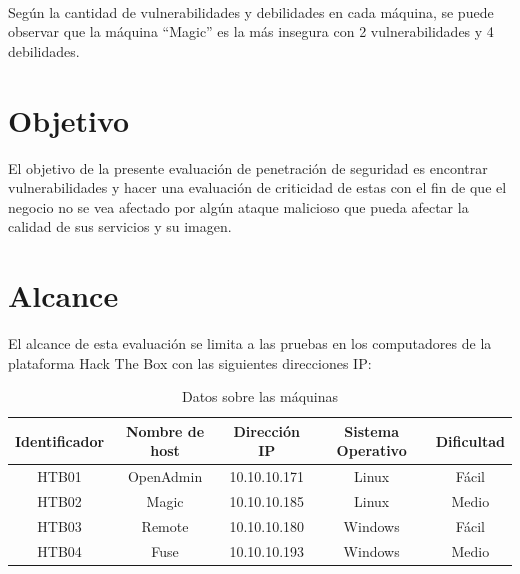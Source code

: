 \documentclass[a4paper]{article}
\begin{document}
\\
\large{Según la cantidad de vulnerabilidades y debilidades en cada máquina, se puede observar que la máquina “Magic” es la más insegura con 2 vulnerabilidades y 4 debilidades.}

\clearpage
\section{Objetivo}
\large{El objetivo de la presente evaluación de penetración de seguridad es encontrar vulnerabilidades y hacer una evaluación de criticidad de estas con el fin de que el negocio no se vea afectado por algún ataque malicioso que pueda afectar la calidad de sus servicios y su imagen.}
\par
\section{Alcance}
\large{El alcance de esta evaluación se limita a las pruebas en los computadores de la plataforma Hack The Box con las siguientes direcciones IP:}
\par
\begin{table}[h]
    \centering
    \begin{tabular}{|c|c|c|c|c|} \hline
        Identificador & Nombre de host & Dirección IP & Sistema Operativo & Dificultad \\ \hline
        HTB01 & OpenAdmin & 10.10.10.171 & Linux & Fácil \\ \hline
        HTB02 & Magic & 10.10.10.185 & Linux & Medio \\ \hline
        HTB03 & Remote & 10.10.10.180 & Windows & Fácil \\ \hline
        HTB04 & Fuse & 10.10.10.193 & Windows & Medio \\ \hline
    \end{tabular}
    \caption{Datos sobre las máquinas}
\end{table}
\par
\end{document}
